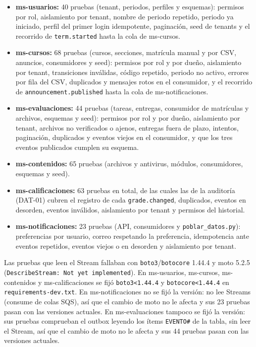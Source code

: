 \begin{itemize}
  \item \textbf{ms-usuarios:} 40 pruebas (tenant, periodos, perfiles y esquemas): permisos por rol,
        aislamiento por tenant, nombre de periodo repetido, periodo ya iniciado, perfil del primer
        login idempotente, paginación, seed de tenants y el recorrido de \texttt{term.started} hasta la
        cola de ms-cursos.
  \item \textbf{ms-cursos:} 68 pruebas (cursos, secciones, matrícula manual y por CSV, anuncios,
        consumidores y seed): permisos por rol y por dueño, aislamiento por tenant, transiciones
        inválidas, código repetido, periodo no activo, errores por fila del CSV, duplicados y mensajes
        rotos en el consumidor, y el recorrido de \texttt{announcement.published} hasta la cola de
        ms-notificaciones.
  \item \textbf{ms-evaluaciones:} 44 pruebas (tareas, entregas, consumidor de matrículas y archivos,
        esquemas y seed): permisos por rol y por dueño, aislamiento por tenant, archivos no verificados
        o ajenos, entregas fuera de plazo, intentos, paginación, duplicados y eventos viejos en el
        consumidor, y que los tres eventos publicados cumplen su esquema.
  \item \textbf{ms-contenidos:} 65 pruebas (archivos y antivirus, módulos, consumidores, esquemas y
        seed).
  \item \textbf{ms-calificaciones:} 63 pruebas en total, de las cuales las de la auditoría (DAT-01) cubren
        el registro de cada \texttt{grade.changed}, duplicados, eventos en desorden, eventos inválidos,
        aislamiento por tenant y permisos del historial.
  \item \textbf{ms-notificaciones:} 23 pruebas (API, consumidores y \texttt{poblar\_datos.py}):
        preferencias por usuario, correo respetando la preferencia, idempotencia ante eventos
        repetidos, eventos viejos o en desorden y aislamiento por tenant.
\end{itemize}
Las pruebas que leen el Stream fallaban con \texttt{boto3}/\texttt{botocore} 1.44.4 y moto 5.2.5
(\texttt{DescribeStream: Not yet implemented}). En ms-usuarios, ms-cursos, ms-contenidos y
ms-calificaciones se fijó \texttt{boto3<1.44.4} y \texttt{botocore<1.44.4} en
\texttt{requirements-dev.txt}.
En ms-notificaciones no se fijó la versión: no lee Streams (consume de colas SQS), así que el cambio
de moto no le afecta y sus 23 pruebas pasan con las versiones actuales.
En ms-evaluaciones tampoco se fijó la versión: sus pruebas comprueban el outbox leyendo los ítems
\texttt{EVENTO\#} de la tabla, sin leer el Stream, así que el cambio de moto no le afecta y sus 44
pruebas pasan con las versiones actuales.


